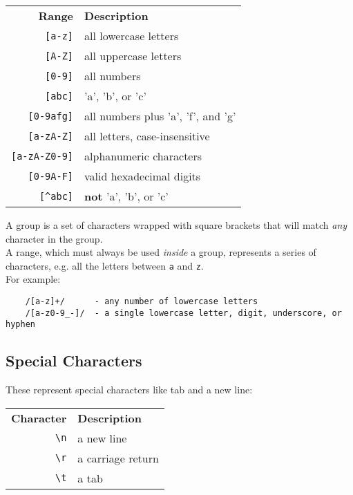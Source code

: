 \begin{center}
    \begin{small}
        \begin{tabularx}{\textwidth}{r l}
            \textbf{Range}          & \textbf{Description} \\
            \texttt{[a-z]}          & all lowercase letters \\
            \texttt{[A-Z]}          & all uppercase letters \\
            \texttt{[0-9]}          & all numbers \\
            \texttt{[abc]}          & 'a', 'b', or 'c' \\
            \texttt{[0-9afg]}       & all numbers plus 'a', 'f', and 'g' \\
            \texttt{[a-zA-Z]}       & all letters, case-insensitive \\
            \texttt{[a-zA-Z0-9]}    & alphanumeric characters \\
            \texttt{[0-9A-F]}       & valid hexadecimal digits \\
            \texttt{[\textasciicircum abc]}         & \textbf{not} 'a', 'b', or 'c'
        \end{tabularx}
    \end{small}
\end{center}

A group is a set of characters wrapped with square brackets that will match \textit{any} character in the group.
\\

A range, which must always be used \textit{inside} a group, represents a series of characters, e.g. all the letters between \texttt{a} and \texttt{z}.
\\

For example:

\begin{verbatim}
    /[a-z]+/      - any number of lowercase letters
    /[a-z0-9_-]/  - a single lowercase letter, digit, underscore, or hyphen
\end{verbatim}

\subsection{Special Characters}

These represent special characters like tab and a new line:

\begin{center}
    \begin{small}
        \begin{tabularx}{\textwidth}{r l}
            \textbf{Character}          & \textbf{Description} \\
            \texttt{\textbackslash n}          & a new line \\
            \texttt{\textbackslash r}          & a carriage return \\
            \texttt{\textbackslash t}          & a tab \\
        \end{tabularx}
    \end{small}
\end{center}


